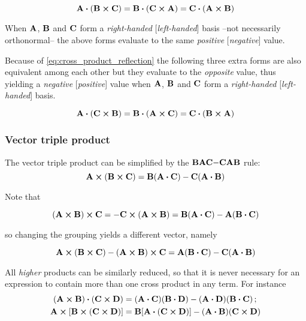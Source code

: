\begin{equation}
\vb{A} \vdot (\vb{B} \cross \vb{C}) = \vb{B} \vdot (\vb{C} \cross \vb{A}) = \vb{C} \vdot (\vb{A} \cross \vb{B})
\label{eq:scalar_triple_product}
\end{equation}

When $\vb{A}$, $\vb{B}$ and $\vb{C}$ form a \textit{right-handed} [\textit{left-handed}] basis --not necessarily orthonormal-- the above forms evaluate to the same \textit{positive} [\textit{negative}] value.  

Because of \ref{eq:cross_product_reflection} the following three extra forms are also equivalent among each other but they evaluate to the \textit{opposite} value, thus yielding a \textit{negative} [\textit{positive}] value when $\vb{A}$, $\vb{B}$ and $\vb{C}$ form a \textit{right-handed} [\textit{left-handed}] basis.

\begin{equation}
\vb{A} \vdot (\vb{C} \cross \vb{B}) = \vb{B} \vdot (\vb{A} \cross \vb{C}) = \vb{C} \vdot (\vb{B} \cross \vb{A})
\end{equation}

\subsubsection{Vector triple product}

The vector triple product can be simplified by the $\vb{BAC}\mathbf{-}\vb{CAB}$ rule:
\begin{equation}
\vb{A} \cross (\vb{B} \cross \vb{C}) = \vb{B} (\vb{A} \vdot \vb{C}) - \vb{C} (\vb{A} \vdot \vb{B})
\label{eq:vector_triple_product}
\end{equation}

Note that 

\begin{equation}
(\vb{A} \cross \vb{B}) \cross \vb{C} = - \vb{C} \cross (\vb{A} \cross \vb{B}) = \vb{B} (\vb{A} \vdot \vb{C}) - \vb{A} (\vb{B} \vdot \vb{C})
\label{eq:vector_triple_product_2}
\end{equation}

so changing the grouping yields a different vector, namely

\begin{equation*}
\vb{A} \cross (\vb{B} \cross \vb{C}) - (\vb{A} \cross \vb{B}) \cross \vb{C} = \vb{A} (\vb{B} \vdot \vb{C})  - \vb{C} (\vb{A} \vdot \vb{B})
\end{equation*}

All \textit{higher} products can be similarly reduced, so that it is never necessary for an expression to contain more than one cross product in any term. For instance
\begin{equation}
\begin{aligned} 
(\vb{A} \cross \vb{B}) \vdot (\vb{C} \cross \vb{D}) &= (\vb{A} \vdot \vb{C}) (\vb{B} \vdot \vb{D}) - (\vb{A} \vdot \vb{D}) (\vb{B} \vdot \vb{C})\, ;  \\
\vb{A} \cross [\vb{B} \cross (\vb{C} \cross \vb{D})] &= \vb{B} [\vb{A} \vdot (\vb{C} \cross \vb{D})] -  (\vb{A} \vdot \vb{B})(\vb{C} \cross \vb{D})
\end{aligned}
\end{equation}

